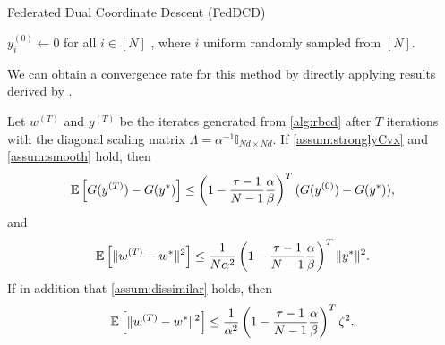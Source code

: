 \begin{algorithm}[t]
    \DontPrintSemicolon
    \caption{Federated Dual Coordinate Descent (FedDCD)\label{alg:rbcd}}
    \smallskip
    $y_i^{(0)} \gets 0$ for all $i \in [N]$
    , where $i$ uniform randomly sampled from $[N]$. 
\end{algorithm}

We can obtain a convergence rate for this method by directly applying results derived by \citet{necoara2017random}.

\begin{theorem} \label{thm:necoaraConvergenceRate}
    Let $w^{(T)}$ and $y^{(T)}$ be the iterates generated from \autoref{alg:rbcd} after $T$ iterations with the diagonal scaling matrix $\Lambda = \alpha^{-1} \mathbb{I}_{Nd \times Nd}$. If \autoref{assum:stronglyCvx} and \autoref{assum:smooth} hold, then
    \begin{equation}
        \mathbb{E} \left[ G( y^{(T)} ) - G( y^* ) \right] \leq \left( 1 - \frac{\tau - 1}{N-1} \frac{\alpha}{\beta} \right)^{T} ( G(y^{(0)}) - G(y^*) ), \label{eq:necoaraDualConvergenceStrongCVX}
    \end{equation}
    and
    \begin{equation}
        \mathbb{E} \left[ \| w^{(T)} - w^* \|^2 \right] 
        \leq \frac{1}{N \alpha^2} \left( 1 - \frac{\tau - 1}{N-1} \frac{\alpha}{\beta} \right)^{T} \|y^*\|^2  \label{eq:necoaraPrimalConvergenceStrongCVX}.
    \end{equation}
    If in addition that \autoref{assum:dissimilar} holds, then
    \begin{equation}
        \mathbb{E} \left[ \| w^{(T)} - w^* \|^2 \right] 
        \leq \frac{1}{\alpha^2} \left( 1 - \frac{\tau - 1}{N-1} \frac{\alpha}{\beta} \right)^{T} \zeta^2. \label{eq:necoaraPrimalConvergenceDissimilar}
    \end{equation}
\end{theorem}


